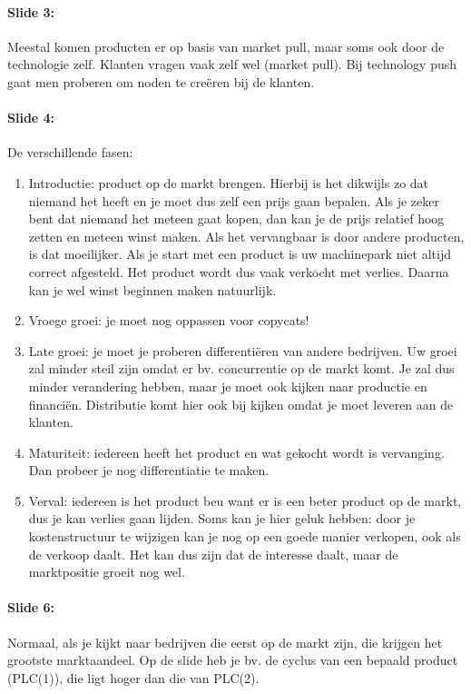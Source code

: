 \documentclass[10pt,a4paper]{report}
\begin{document}
\paragraph{Slide 3:} Meestal komen producten er op basis van market pull, maar soms ook door de technologie zelf. Klanten vragen vaak zelf wel (market pull). Bij technology push gaat men proberen om noden te cre\"eren bij de klanten.

\paragraph{Slide 4:} De verschillende fasen: 
\begin{enumerate}
\item Introductie: product op de markt brengen. Hierbij is het dikwijls zo dat niemand het heeft en je moet dus zelf een prijs gaan bepalen. Als je zeker bent dat niemand het meteen gaat kopen, dan kan je de prijs relatief hoog zetten en meteen winst maken. Als het vervangbaar is door andere producten, is dat moeilijker. Als je start met een product is uw machinepark niet altijd correct afgesteld. Het product wordt dus vaak verkocht met verlies. Daarna kan je wel winst beginnen maken natuurlijk. 
\item Vroege groei: je moet nog oppassen voor copycats! 
\item Late groei: je moet je proberen differenti\"eren van andere bedrijven. Uw groei zal minder steil zijn omdat er bv. concurrentie op de markt komt. Je zal dus minder verandering hebben, maar je moet ook kijken naar productie en financi\"en. Distributie komt hier ook bij kijken omdat je moet leveren aan de klanten.
\item Maturiteit: iedereen heeft het product en wat gekocht wordt is vervanging. Dan probeer je nog differentiatie te maken.
\item Verval: iedereen is het product beu want er is een beter product op de markt, dus je kan verlies gaan lijden. Soms kan je hier geluk hebben: door je kostenstructuur te wijzigen kan je nog op een goede manier verkopen, ook als de verkoop daalt. Het kan dus zijn dat de interesse daalt, maar de marktpositie groeit nog wel.
\end{enumerate}

\paragraph{Slide 6:} Normaal, als je kijkt naar bedrijven die eerst op de markt zijn, die krijgen het grootste marktaandeel. Op de slide heb je bv. de cyclus van een bepaald product (PLC(1)), die ligt hoger dan die van PLC(2). 
\end{document}
